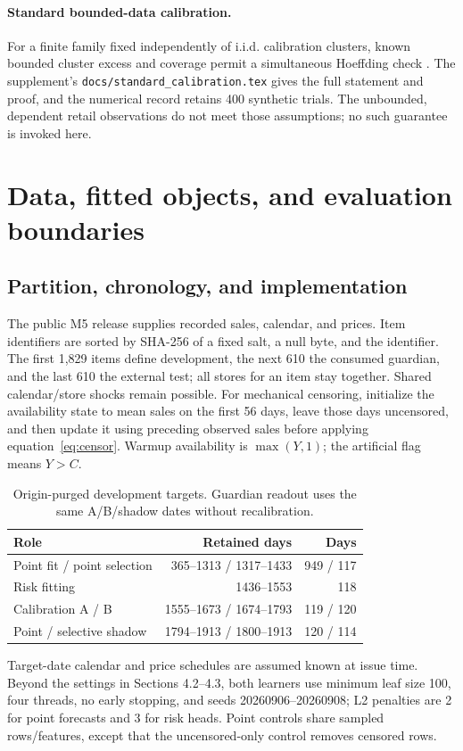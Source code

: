 \paragraph{Standard bounded-data calibration.}\label{app:calibration}
For a finite family fixed independently of i.i.d. calibration clusters, known bounded cluster excess and coverage permit a simultaneous Hoeffding check \citep{hoeffding1963}. The supplement's \texttt{docs/standard\_calibration.tex} gives the full statement and proof, and the numerical record retains 400 synthetic trials. The unbounded, dependent retail observations do not meet those assumptions; no such guarantee is invoked here.

\section{Data, fitted objects, and evaluation boundaries}
\label{app:repro}
\subsection{Partition, chronology, and implementation}
The public M5 release \citep{m5data} supplies recorded sales, calendar, and prices. Item identifiers are sorted by SHA-256 of a fixed salt, a null byte, and the identifier. The first 1,829 items define development, the next 610 the consumed guardian, and the last 610 the external test; all stores for an item stay together. Shared calendar/store shocks remain possible. For mechanical censoring, initialize the availability state to mean sales on the first 56 days, leave those days uncensored, and then update it using preceding observed sales before applying equation~\eqref{eq:censor}. Warmup availability is $\max(Y,1)$; the artificial flag means $Y>C$.

\begin{table}[htbp]
\centering\small
\caption{Origin-purged development targets. Guardian readout uses the same A/B/shadow dates without recalibration.}
\label{tab:chronology}
\begin{tabular}{lrr}\toprule
Role & Retained days & Days\\\midrule
Point fit / point selection & 365--1313 / 1317--1433 & 949 / 117\\
Risk fitting & 1436--1553 & 118\\
Calibration A / B & 1555--1673 / 1674--1793 & 119 / 120\\
Point / selective shadow & 1794--1913 / 1800--1913 & 120 / 114\\
\bottomrule\end{tabular}
\end{table}
Target-date calendar and price schedules are assumed known at issue time. Beyond the settings in Sections 4.2--4.3, both learners use minimum leaf size 100, four threads, no early stopping, and seeds 20260906--20260908; L2 penalties are 2 for point forecasts and 3 for risk heads. Point controls share sampled rows/features, except that the uncensored-only control removes censored rows.

